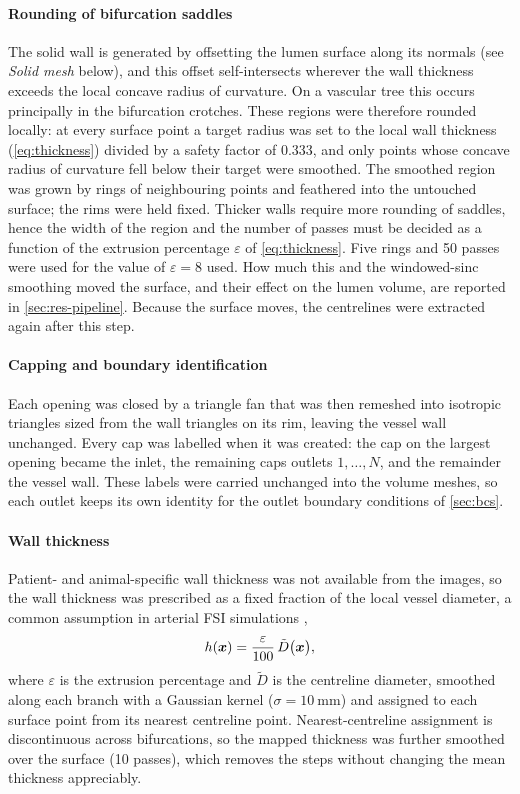 \paragraph{Rounding of bifurcation saddles}
The solid wall is generated by offsetting the lumen surface along its normals (see \emph{Solid mesh} below), and this offset self-intersects wherever the wall thickness exceeds the local concave radius of curvature.
On a vascular tree this occurs principally in the bifurcation crotches.
These regions were therefore rounded locally: at every surface point a target radius was set to the local wall thickness (\cref{eq:thickness}) divided by a safety factor of 0.333, and only points whose concave radius of curvature fell below their target were smoothed.
The smoothed region was grown by rings of neighbouring points and feathered into the untouched surface; the rims were held fixed.
Thicker walls require more rounding of saddles, hence the width of the region and the number of passes must be decided as a function of the extrusion percentage $\varepsilon$ of \cref{eq:thickness}.
Five rings and 50 passes were used for the value of $\varepsilon = 8$ used. 
How much this and the windowed-sinc smoothing moved the surface, and their effect on the lumen volume, are reported in \cref{sec:res-pipeline}.
Because the surface moves, the centrelines were extracted again after this step.

\paragraph{Capping and boundary identification}
Each opening was closed by a triangle fan that was then remeshed into isotropic triangles sized from the wall triangles on its rim, leaving the vessel wall unchanged.
Every cap was labelled when it was created: the cap on the largest opening became the inlet, the remaining caps outlets $1,\dots,N$, and the remainder the vessel wall.
These labels were carried unchanged into the volume meshes, so each outlet keeps its own identity for the outlet boundary conditions of \cref{sec:bcs}.

\paragraph{Wall thickness}
Patient- and animal-specific wall thickness was not available from the images, so the wall thickness was prescribed as a fixed fraction of the local vessel diameter, a common assumption in arterial FSI simulations \citep{liu2020fluid,zambranoImagebasedComputationalAssessment2018,yangEvolutionHemodynamicForces2019},
\begin{equation}
  h(\boldsymbol{x}) = \frac{\varepsilon}{100}\, \tilde{D}\big(\boldsymbol{x}\big),
  \label{eq:thickness}
\end{equation}
where $\varepsilon$ is the extrusion percentage and $\tilde{D}$ is the centreline diameter, smoothed along each branch with a Gaussian kernel ($\sigma = \SI{10}{\milli\metre}$) and assigned to each surface point from its nearest centreline point.
Nearest-centreline assignment is discontinuous across bifurcations, so the mapped thickness was further smoothed over the surface (10 passes), which removes the steps without changing the mean thickness appreciably.

